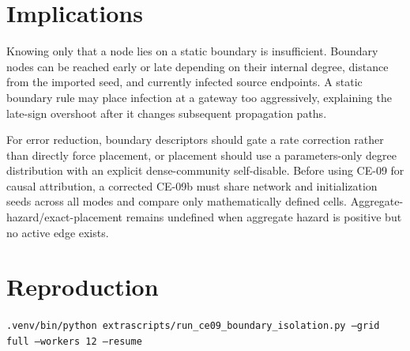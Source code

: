 \documentclass[11pt,a4paper]{article}
\begin{document}
\section{Implications}
Knowing only that a node lies on a static boundary is insufficient. Boundary nodes can be reached early or late depending on their internal degree, distance from the imported seed, and currently infected source endpoints. A static boundary rule may place infection at a gateway too aggressively, explaining the late-sign overshoot after it changes subsequent propagation paths.

For error reduction, boundary descriptors should gate a rate correction rather than directly force placement, or placement should use a parameters-only degree distribution with an explicit dense-community self-disable. Before using CE-09 for causal attribution, a corrected CE-09b must share network and initialization seeds across all modes and compare only mathematically defined cells. Aggregate-hazard/exact-placement remains undefined when aggregate hazard is positive but no active edge exists.
\section*{Reproduction}
\texttt{.venv/bin/python extrascripts/run\_ce09\_boundary\_isolation.py --grid full --workers 12 --resume}
\end{document}
